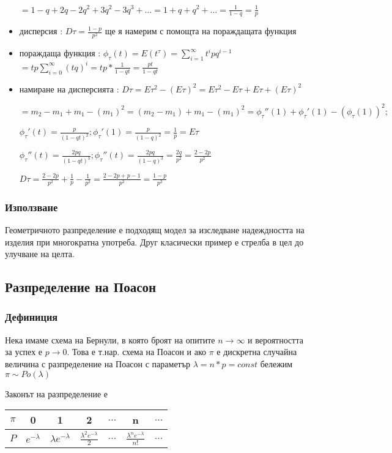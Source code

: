 \documentclass[fleqn,12pt]{article}
\begin{document}
\begin{justify}
\begin{itemize}
    $= 1 - q + 2q - 2q^2 + 3q^2 -3q^3 + \dots = 1 + q + q^2 + \dots = \frac{1}{1-q} = \frac{1}{p}$
    \item дисперсия : $D\tau = \frac{1-p}{p^2}$ ще я намерим с помощта на пораждащата функция
    \item пораждаща функция : $\phi_\tau(t) = E(t^\tau) = \sum_{i=1}^\infty t^i p q^{i - 1}$
    $ = tp \sum_{i=0}^\infty (tq)^i = tp*\frac{1}{1-qt} = \frac{pt}{1-qt}$
    \item намиране на дисперсията : 
    $D\tau = E\tau^2 - (E\tau)^2 = E\tau^2 - E\tau + E\tau + (E\tau)^2 $

    $= m_2 - m_1 + m_1 - (m_1)^2 = (m_2 - m_1) + m_1 - (m_1)^2 = \phi_\tau''(1) + \phi_\tau'(1) - (\phi_\tau(1))^2;$
    
    \vspace{10pt}
    $\phi_\tau'(t) = \frac{p}{(1-qt)^2}; \phi_\tau'(1) = \frac{p}{(1-q)^2} = \frac{1}{p} = E\tau$
    
    $\phi_\tau''(t) = \frac{2pq}{(1-qt)^3}; \phi_\tau''(t) = \frac{2pq}{(1-q)^3} = \frac{2q}{p^2} = \frac{2- 2p}{p^2}$
    
    \vspace{10pt}
    $D\tau = \frac{2- 2p}{p^2} + \frac{1}{p} - \frac{1}{p^2} = \frac{2-2p+p-1}{p^2} = \frac{1-p}{p^2}$
\end{itemize}
\subsubsection{Използване} 
Геометричното разпределение е подходящ модел за изследване надеждността на изделия при многократна употреба. Друг
класически пример е стрелба в цел до улучване на целта.

\subsection{Разпределение на Поасон}
\subsubsection{Дефиниция}
Нека имаме схема на Бернули, в която броят на опитите $n \rightarrow \infty$ и вероятността за успех е 
$p \rightarrow 0$. Това е т.нар. схема на Поасон и ако $\pi$ е дискретна случайна величина с разпределение на 
Поасон с параметър $\lambda = n*p = const$ бележим $\pi \sim Po(\lambda)$

Законът на разпределение е

\begin{tabular}{|c|c|c|c|c|c|c|}
    \hline
    $\pi$ & 0 & 1 & 2 & $\dots$ & n & $\dots$ \\
    \hline
    $P$ & $e^{-\lambda}$ & $\lambda e^{-\lambda}$ & $\frac{\lambda^2 e^{-\lambda}}{2}$ & $\dots$ & $\frac{\lambda^n
    e^{-\lambda}}{n!}$& $\dots$ \\
    \hline
\end{tabular}


\end{justify}
\end{document}
